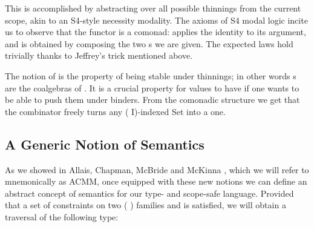 \noindent
\begin{minipage}{0.95\textwidth}
\begin{minipage}{0.45\textwidth}
\end{minipage}\hfill
\begin{minipage}{0.45\textwidth}
\end{minipage}

\begin{minipage}{0.26\textwidth}
\end{minipage}\hfill
\begin{minipage}{0.37\textwidth}
\end{minipage}\hfill
\begin{minipage}{0.29\textwidth}
\end{minipage}

\end{minipage}
This is accomplished by abstracting over all possible thinnings
from the current scope, akin to an S4-style necessity modality. The axioms of S4
modal logic incite us to observe that the functor  is a comonad: 
applies the identity  to its argument, and  is obtained
by composing the two s we are given. The expected laws hold trivially
thanks to Jeffrey's trick mentioned above.

The notion of  is the property of being stable under thinnings;
in other words s are the coalgebras of .
It is a crucial property for values to have if one wants to be able to push
them under binders. From the comonadic structure we get that
the  combinator freely turns any ( I)-indexed Set into a
 one.

\subsection{A Generic Notion of Semantics}

As we showed in Allais, Chapman, McBride and McKinna
\citeyear{allais2017type}, which we will refer to mnemonically as
ACMM, once equipped with these new notions we can define an abstract
concept of semantics for our type- and scope-safe language. Provided
that a set of constraints on two ({ }) families
 and  is satisfied, we will obtain a traversal of the
following type:

